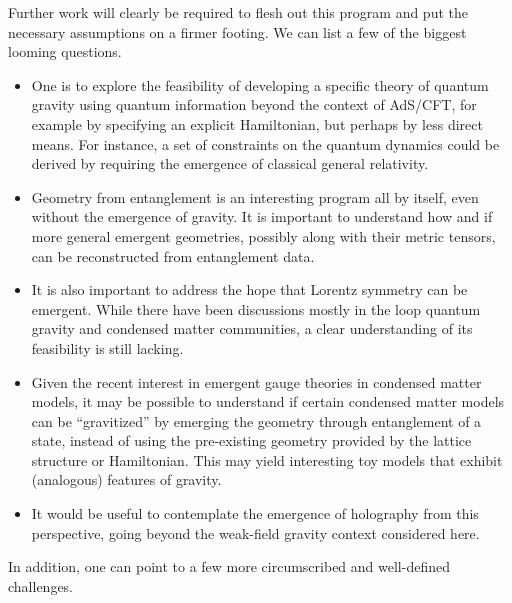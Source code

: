 \documentclass[%
preprint,
nofootinbib,
amsmath,amssymb,
aps,
prd,
showpacs,
superscriptaddress
]{revtex4-1}
\begin{document}
Further work will clearly be required to flesh out this program and put the necessary assumptions on a firmer footing.
We can list a few of the biggest looming questions.
\begin{itemize}
	\item One is to explore the feasibility of developing a specific theory of quantum gravity using quantum information beyond the context of AdS/CFT, for example by specifying an explicit Hamiltonian, but perhaps by less direct means. For instance, a set of constraints on the quantum dynamics could be derived by requiring the emergence of classical general relativity. 
	
	\item Geometry from entanglement is an interesting program all by itself, even without the emergence of gravity. It is important to understand how and if more general emergent geometries, possibly along with their metric tensors, can be reconstructed from entanglement data. 
	
	\item It is also important to address the hope that Lorentz symmetry can be emergent. While there have been discussions mostly in the loop quantum gravity and condensed matter communities, a clear understanding of its feasibility is still lacking. 
	
	\item Given the recent interest in emergent gauge theories in condensed matter models, it may be possible to understand if certain condensed matter models can be ``gravitized'' by emerging the geometry through entanglement of a state, instead of using the pre-existing geometry provided by the lattice structure or Hamiltonian. This may yield interesting toy models that exhibit (analogous) features of gravity.
	
	\item It would be useful to contemplate the emergence of holography from this perspective, going beyond the weak-field gravity context considered here.
\end{itemize}
In addition, one can point to a few more circumscribed and well-defined challenges.
\end{document}
